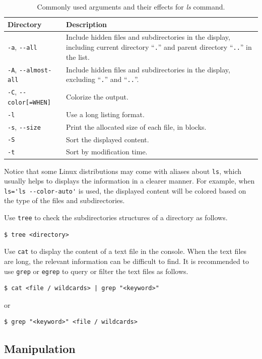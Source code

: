 \begin{table}[!htb]
  \centering \caption{Commonly used arguments and their effects for \textit{ls} command.}\label{ch:fm:tab:lscommandargument}
  \begin{tabularx}{\textwidth}{lX}
    \hline
    Directory & Description \\ \hline
    \verb|-a|, \verb|--all| & Include hidden files and subdirectories in the display, including current directory ``\verb|.|'' and parent directory ``\verb|..|'' in the list. \\ 
    \verb|-A|, \verb|--almost-all| & Include hidden files and subdirectories in the display, excluding ``\verb|.|'' and ``\verb|..|''. \\ 
    \verb|-C|, \verb|--color[=WHEN]| & Colorize the output. \\ 
    \verb|-l| & Use a long listing format. \\ 
    \verb|-s|, \verb|--size| & Print the allocated size of each file, in blocks. \\ 
    \verb|-S| & Sort the displayed content. \\ 
    \verb|-t| & Sort by modification time. \\
    \hline
  \end{tabularx}
\end{table}

Notice that some Linux distributions may come with aliases about \verb|ls|, which usually helps to displays the information in a clearer manner. For example, when \verb|ls='ls --color-auto'| is used, the displayed content will be colored based on the type of the files and subdirectories.

Use \verb|tree| to check the subdirectories structures of a directory as follows.
\begin{lstlisting}
$ tree <directory>
\end{lstlisting}

Use \verb|cat| to display the content of a text file in the console. When the text files are long, the relevant information can be difficult to find. It is recommended to use \verb|grep| or \verb|egrep| to query or filter the text files as follows.
\begin{lstlisting}
$ cat <file / wildcards> | grep "<keyword>"
\end{lstlisting}
or
\begin{lstlisting}
$ grep "<keyword>" <file / wildcards>
\end{lstlisting}

\subsection{Manipulation}

